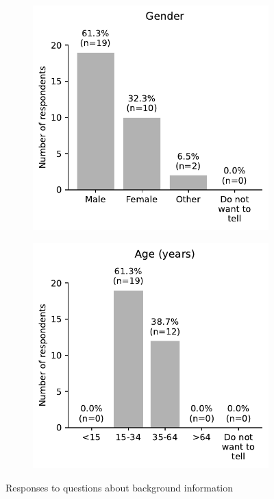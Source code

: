 \begin{appendices}
\begin{figure}[H]
	\begin{subfigure}[b]{0.5\textwidth}
		\includegraphics[width=\textwidth]{visual/figures/survey/13.pdf}
	\end{subfigure}%
	\hfill
	\begin{subfigure}[b]{0.5\textwidth}
		\includegraphics[width=\textwidth]{visual/figures/survey/14.pdf}
	\end{subfigure}%
	\newline
	Responses to questions about background information
\end{figure}

\end{appendices}
